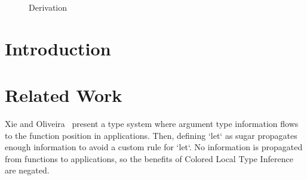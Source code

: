 \documentclass[9pt]{extarticle}
\begin{document}
\begin{landscape}
\begin{figure}
\begin{mathpar}
  \end{mathpar}
\caption{Derivation}
\end{figure}
\end{landscape}

\newpage

\section{Introduction}

\section{Related Work}

Xie and Oliveira~\cite{xie2018let} present a type system where
argument type information flows to the function position in applications.
Then, defining `let` as sugar propagates enough information to avoid
a custom rule for `let`.
No information is propagated from functions to applications, so the benefits
of Colored Local Type Inference are negated.

%


\printbibliography
\end{document}
